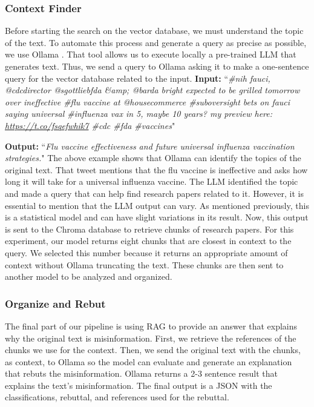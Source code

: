 \subsubsection{Context Finder}
Before starting the search on the vector database, we must understand the topic of the text. To automate this process and generate a query as precise as possible, we use Ollama \cite{ollama}. That tool allows us to execute locally a pre-trained LLM that generates text. Thus, we send a query to Ollama asking it to make a one-sentence query for the vector database related to the input.
\newline
\newline
\textbf{Input:} ``\textit{\#nih fauci, @cdcdirector @sgottliebfda \&amp; @barda bright expected to be grilled tomorrow over ineffective \#flu vaccine at @housecommerce \#suboversight bets on fauci saying universal \#influenza vax in 5, maybe 10 years? my preview here: \url{https://t.co/fsqefwhik7} \#cdc \#fda \#vaccines}"

\textbf{Output:} ``\textit{Flu vaccine effectiveness and future universal influenza vaccination strategies.}"
 \newline
 \newline
The above example shows that Ollama can identify the topics of the original text. That tweet mentions that the flu vaccine is ineffective and asks how long it will take for a universal influenza vaccine. The LLM identified the topic and made a query that can help find
research papers related to it. However, it is essential to mention that the LLM output can vary. As mentioned previously, this is a statistical model and can have slight variations in its result. Now, this output is sent to the Chroma database to retrieve chunks of research
papers. For this experiment, our model returns eight chunks that are closest in context to the query. We selected this number because it returns an appropriate amount of context without Ollama truncating the text. These chunks are then sent to another model to be analyzed and organized.

\subsubsection{Organize and Rebut}
The final part of our pipeline is using RAG to provide an answer that explains why the original text is misinformation. First, we retrieve the references of the chunks we use for the context. Then, we send the original text with the chunks, as context, to Ollama so the model can evaluate and generate an explanation that rebuts the misinformation. Ollama returns a 2-3 sentence result that explains the text’s misinformation. The final output is a JSON with the classifications, rebuttal, and references used for the rebuttal.


